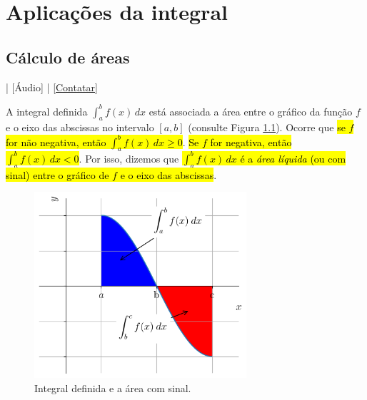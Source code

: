 
\chapter{Aplicações da integral}\label{cap_apint}
\thispagestyle{fancy}

\section{Cálculo de áreas}\label{cap_apint_sec_areas}

\begin{flushright}
  [Vídeo] | [Áudio] | \href{https://phkonzen.github.io/notas/contato.html}{[Contatar]}
\end{flushright}

A integral definida $\int_a^b f(x)\,dx$ está associada a área entre o gráfico da função $f$ e o eixo das abscissas no intervalo $[a,b]$ (consulte Figura \ref{fig:apint_arealiq}). Ocorre que \hl{se $f$ for não negativa, então $\int_a^b f(x)\,dx \geq 0$}. \hl{Se $f$ for negativa, então $\int_a^b f(x)\,dx < 0$}. Por isso, dizemos que \hl{$\int_a^b f(x)\,dx$ é a \emph{área líquida} (ou com sinal) entre o gráfico de $f$ e o eixo das abscissas}.

\begin{figure}[H]
  \centering
  \includegraphics[width=0.7\textwidth]{./cap_apint/dados/fig_apint_arealiq/fig}
  \caption{Integral definida e a área com sinal.}
  \label{fig:apint_arealiq}
\end{figure}

